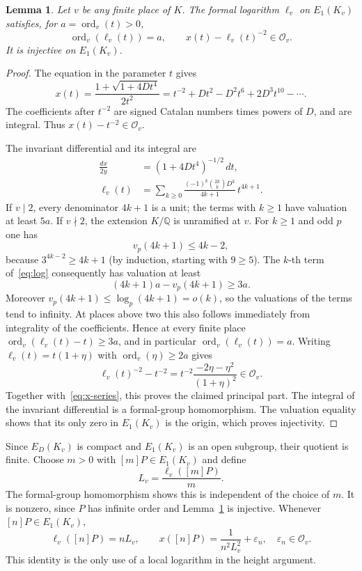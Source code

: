 \documentclass[11pt,a4paper]{article}
\newtheorem{lemma}[theorem]{Lemma}
\newcommand{\Q}{\mathbb Q}\newcommand{\Z}{\mathbb Z}
\newcommand{\ord}{\operatorname{ord}}
\begin{document}
\begin{lemma}\label{lem:local}
Let $v$ be any finite place of $K$. The formal logarithm
$\ell_v$ on $E_1(K_v)$ satisfies, for $a=\ord_v(t)>0$,
\[
 \ord_v(\ell_v(t))=a,
 \qquad x(t)-\ell_v(t)^{-2}\in\mathcal O_v.
\]
It is injective on $E_1(K_v)$.
\end{lemma}
\begin{proof}
The equation in the parameter $t$ gives
\begin{equation}\label{eq:x-series}
 x(t)=\frac{1+\sqrt{1+4Dt^4}}{2t^2}
 =t^{-2}+Dt^2-D^2t^6+2D^3t^{10}-\cdots.
\end{equation}
The coefficients after $t^{-2}$ are signed Catalan numbers
times powers of $D$, and are integral. Thus
$x(t)-t^{-2}\in\mathcal O_v$.

The invariant differential and its integral are
\begin{align}
 \frac{dx}{2y}&=(1+4Dt^4)^{-1/2}\,dt,\label{eq:differential}\\
 \ell_v(t)&=\sum_{k\ge0}
  \frac{(-1)^k\binom{2k}{k}D^k}{4k+1}\,t^{4k+1}.
                                                        \label{eq:log}
\end{align}
If $v\mid2$, every denominator $4k+1$ is a unit; the terms
with $k\ge1$ have valuation at least $5a$.
If $v\nmid2$, the extension $K/\Q$ is unramified at $v$.
For $k\ge1$ and odd $p$ one has
\[
 v_p(4k+1)\le4k-2,
\]
because $3^{4k-2}\ge4k+1$ (by induction, starting with
$9\ge5$). The $k$-th term of~\eqref{eq:log} consequently
has valuation at least
\[
 (4k+1)a-v_p(4k+1)\ge3a.
\]
Moreover $v_p(4k+1)\le\log_p(4k+1)=o(k)$, so the valuations
of the terms tend to infinity. At places above two this
also follows immediately from integrality of the coefficients.
Hence at every finite place
$\ord_v(\ell_v(t)-t)\ge3a$, and in particular
$\ord_v(\ell_v(t))=a$. Writing $\ell_v(t)=t(1+\eta)$
with $\ord_v(\eta)\ge2a$ gives
\[
 \ell_v(t)^{-2}-t^{-2}
 =t^{-2}\frac{-2\eta-\eta^2}{(1+\eta)^2}\in\mathcal O_v.
\]
Together with~\eqref{eq:x-series}, this proves the claimed
principal part. The integral of the invariant differential
is a formal-group homomorphism. The valuation equality
shows that its only zero in $E_1(K_v)$ is the origin, which
proves injectivity.
\end{proof}

Since $E_D(K_v)$ is compact and $E_1(K_v)$ is an open subgroup,
their quotient is finite. Choose $m>0$ with $[m]P\in E_1(K_v)$
and define
\[
 L_v=\frac{\ell_v([m]P)}m.
\]
The formal-group homomorphism shows this is independent of
the choice of $m$. It is nonzero, since $P$ has infinite order
and Lemma~\ref{lem:local} is injective. Whenever
$[n]P\in E_1(K_v)$,
\begin{equation}\label{eq:rank-one}
 \ell_v([n]P)=nL_v,
 \qquad x([n]P)=\frac1{n^2L_v^2}+\varepsilon_n,
 \quad \varepsilon_n\in\mathcal O_v.
\end{equation}
This identity is the only use of a local logarithm in the
height argument.
\end{document}
